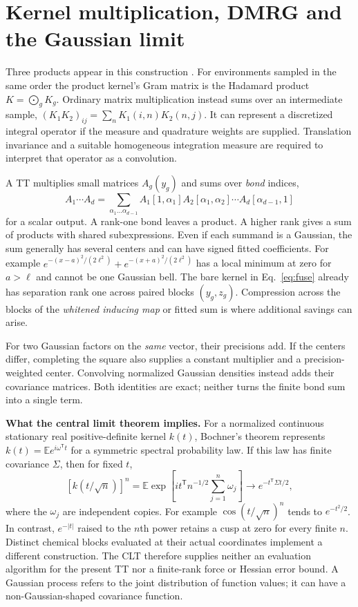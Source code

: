 \documentclass[11pt,a4paper]{article}
\newcommand{\T}{\mathsf T}\newcommand{\tr}{\operatorname{tr}}
\begin{document}
\pg\section{Kernel multiplication, DMRG and the Gaussian limit}
Three products appear in this construction \cite{gpml,clt,oseledets}. For environments sampled in the same order the product kernel's Gram matrix is the Hadamard product $K=\bigodot_g K_g$. Ordinary matrix multiplication instead sums over an intermediate sample, $(K_1K_2)_{ij}=\sum_n K_1(i,n)K_2(n,j)$. It can represent a discretized integral operator if the measure and quadrature weights are supplied. Translation invariance and a suitable homogeneous integration measure are required to interpret that operator as a convolution.

A TT multiplies small matrices $A_g(y_g)$ and sums over \emph{bond} indices,
\[
 A_1\cdots A_d=\sum_{\alpha_1\ldots\alpha_{d-1}}
 A_1[1,\alpha_1]A_2[\alpha_1,\alpha_2]\cdots A_d[\alpha_{d-1},1]
\]
for a scalar output. A rank-one bond leaves a product. A higher rank gives a sum of products with shared subexpressions. Even if each summand is a Gaussian, the sum generally has several centers and can have signed fitted coefficients. For example $e^{-(x-a)^2/(2\ell^2)}+e^{-(x+a)^2/(2\ell^2)}$ has a local minimum at zero for $a>\ell$ and cannot be one Gaussian bell. The bare kernel in Eq.~\eqref{eq:fuse} already has separation rank one across paired blocks $(y_g,z_g)$. Compression across the blocks of the \emph{whitened inducing map} or fitted sum is where additional savings can arise.

For two Gaussian factors on the \emph{same} vector, their precisions add. If the centers differ, completing the square also supplies a constant multiplier and a precision-weighted center. Convolving normalized Gaussian densities instead adds their covariance matrices. Both identities are exact; neither turns the finite bond sum into a single term.

\textbf{What the central limit theorem implies.} For a normalized continuous stationary real positive-definite kernel $k(t)$, Bochner's theorem represents $k(t)=\mathbb E e^{i\omega^\T t}$ for a symmetric spectral probability law. If this law has finite covariance $\Sigma$, then for fixed $t$,
\[
 [k(t/\sqrt n)]^n
 =\mathbb E\exp\!\left[i t^\T n^{-1/2}\sum_{j=1}^n\omega_j\right]
 \longrightarrow e^{-t^\T\Sigma t/2},
\]
where the $\omega_j$ are independent copies. For example $\cos(t/\sqrt n)^n$ tends to $e^{-t^2/2}$. In contrast, $e^{-|t|}$ raised to the $n$th power retains a cusp at zero for every finite $n$. Distinct chemical blocks evaluated at their actual coordinates implement a different construction. The CLT therefore supplies neither an evaluation algorithm for the present TT nor a finite-rank force or Hessian error bound. A Gaussian process refers to the joint distribution of function values; it can have a non-Gaussian-shaped covariance function.
\end{document}
